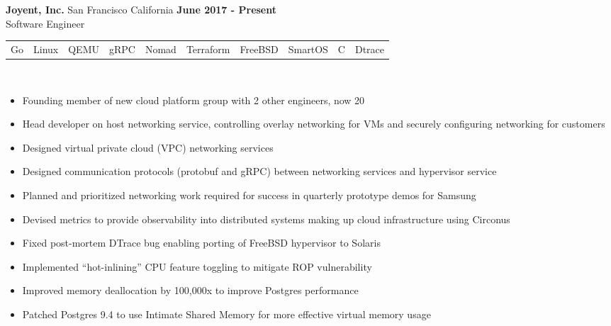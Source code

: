 \documentclass[resmargin,line,12pt]{res}
\begin{document}
{\begin{resume}
{\bf Joyent, Inc.} San Francisco California \hfill {\bf June 2017 - Present} \
\\
{Software Engineer}
\\
\begin{tabular}{l l l l l l l l l l}
  Go & Linux & QEMU & gRPC & Nomad & Terraform & FreeBSD & SmartOS & C & Dtrace
\end{tabular}
\\
\vspace{-.10in}
\begin{itemize}
  \item Founding member of new cloud platform group with 2 other engineers, now 20
  \item Head developer on host networking service, controlling overlay networking for VMs and securely configuring networking for customers
  \item Designed virtual private cloud (VPC) networking services
  \item Designed communication protocols (protobuf and gRPC) between networking services and hypervisor service
  \item Planned and prioritized networking work required for success in quarterly prototype demos for Samsung
  \item Devised metrics to provide observability into distributed systems making up cloud infrastructure using Circonus
  \item Fixed post-mortem DTrace bug enabling porting of FreeBSD hypervisor to Solaris
  \item Implemented ``hot-inlining'' CPU feature toggling to mitigate ROP vulnerability
  \item Improved memory deallocation by 100,000x to improve Postgres performance %
  \item Patched Postgres 9.4 to use Intimate Shared Memory for more effective virtual memory usage %
\end{itemize}



\end{resume}}
\end{document}

